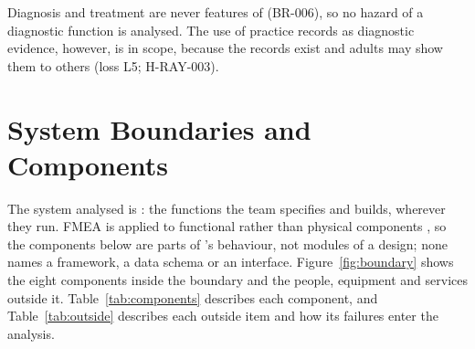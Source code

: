 \documentclass{article}
\begin{document}
Diagnosis and treatment are never features of \progname{} (BR-006), so no hazard
of a diagnostic function is analysed. The use of practice records as diagnostic
evidence, however, is in scope, because the records exist and adults may show
them to others (loss L5; H-RAY-003).

\section{System Boundaries and Components}\label{sec:boundary}

The system analysed is \progname{}: the functions the team specifies and builds,
wherever they run. FMEA is applied to functional rather than physical components
\citep{Smith2026L08}, so the components below are parts of \progname{}'s
behaviour, not modules of a design; none names a framework, a data schema or an
interface. Figure~\ref{fig:boundary} shows the eight components inside the
boundary and the people, equipment and services outside it.
Table~\ref{tab:components} describes each component, and Table~\ref{tab:outside}
describes each outside item and how its failures enter the analysis.
\end{document}
